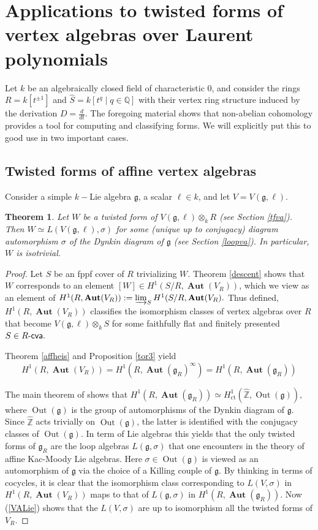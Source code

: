 \documentclass{article}
\newtheorem{thm}{Theorem}[section]
\theoremstyle{definition}
\def\Out{\ensuremath{\operatorname{Out}}}
\def\BAut{\ensuremath{\operatorname{\mathbf{Aut}}}}
\def\Rcva{\ensuremath{R\text{-\textup{\textsf{cva}}}}}
\def\fg{\ensuremath{\mathfrak{g}}}
\begin{document}
\section{Applications to twisted forms of vertex algebras over Laurent polynomials} \label{app}


Let $k$ be an algebraically closed field of characteristic 0, and consider the rings $R = k[t^{\pm 1}]$ and $\widehat S = k[t^q \mid q \in \mathbb Q]$ with their vertex ring structure induced by the derivation $D = \frac{d}{dt}$.  The foregoing material shows that non-abelian cohomology provides a tool for computing and classifying forms. We will explicitly put this to good use in two important cases.

\subsection{Twisted forms of affine vertex algebras}
Consider  a simple $k-$Lie algebra $\mathfrak g$, a scalar $\ell \in k$, and let $V = V(\mathfrak g, \ell)$.
\begin{thm} Let $W$ be a twisted form of $V(\fg, \ell) \otimes_k R$ (see Section \ref{tfva}). Then $W \simeq L(V(\fg, \ell), \sigma)$ for some (unique up to conjugacy) diagram automorphism $\sigma$ of the Dynkin diagram of $\fg$ (see Section \ref{loopva}). In particular, $W$ is isotrivial.
\end{thm} 
\begin{proof}
	Let $S$ be an fppf cover of $R$ trivializing $W$.
Theorem \ref{descent} shows that $W$ corresponds to an element $[W] \in H^1( S/R, \BAut(V_R))$, which we view as an element of $H^1(R, \BAut(V_R)) := \varinjlim_S H^1(S/R, \BAut(V_R).$  Thus defined,  $H^1(R, \BAut(V_R))$ classifies the isomorphism classes of vertex algebras over $R$ that become $V(\fg, \ell) \otimes_k S$  for some faithfully flat and finitely presented $S \in \Rcva.$


Theorem \ref{affheis} and Proposition \ref{tor3} yield
\begin{equation}\label{VALie}
 H^1(R, \BAut(V_R)) = H^1(R, \BAut(\mathfrak g_R)^\infty) = H^1(R, \BAut(\mathfrak g_R))
 \end{equation}
 
 The main theorem of \cite{Pianzola2} shows that $H^1(R, \BAut(\mathfrak g_R)) \simeq H^1_{\operatorname{ct}}(\widehat {\mathbb Z}, \Out(\fg)),$ where $\Out(\fg)$  is the group of automorphisms  of the Dynkin diagram of $\fg.$ Since $\widehat{\mathbb Z}$ acts trivially on $\Out(\fg)$, the latter is identified with the conjugacy classes of $\Out(\fg)$. In term of Lie algebras this yields that the only twisted forms of $\fg_R$ are the loop algebras $L(\fg, \sigma)$ that one encounters in the theory of affine Kac-Moody Lie algebras. Here $\sigma \in \Out(\fg)$ is viewed as an automorphism of $\fg$ via the choice of a Killing couple  of $\fg.$ By thinking in terms of cocycles, it is clear that  the isomorphism class corresponding to $L(V, \sigma)$ in $H^1(R, \BAut(V_R))$ maps to that of $L(\fg, \sigma)$ in $H^1(R, \BAut(\fg_R)).$  Now (\ref{VALie}) shows that the  $L(V, \sigma)$ are up to isomorphism all the twisted forms of $V_R.$
\end{proof}
\end{document}
